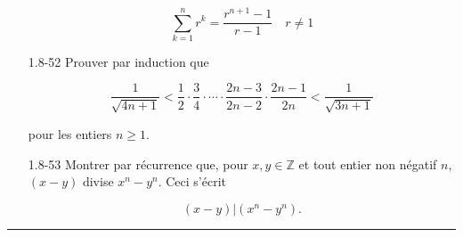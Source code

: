 \documentclass[10pt,twoside,a4paper]{book}
\begin{document}
\begin{enumerate}
  \begin{equation*}
    \sum_{k=1}^{n}r^k = \frac{r^{n+1}-1}{r-1} \quad r \neq 1
  \end{equation*}
  \item[1.8-52] Prouver par induction que
  
  \begin{equation*}
    \frac{1}{\sqrt{4n+1}} < \frac{1}{2} \cdot \frac{3}{4} \cdot \cdots \cdot \frac{2n-3}{2n-2} \cdot \frac{2n-1}{2n} < \frac{1}{\sqrt{3n+1}}
  \end{equation*}

  \noindent
  pour les entiers $n \geq 1$.
  \item[1.8-53] Montrer par récurrence que, pour $x,y \in \mathbb{Z}$ et tout entier non négatif $n$, $(x-y)$ divise $x^n-y^n$. Ceci s'écrit
  
  \begin{equation*}
    (x-y)|(x^n-y^n).
  \end{equation*}
\end{enumerate}

\par\noindent\rule{\textwidth}{0.6pt}
\end{document}
